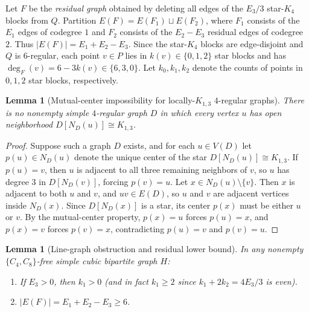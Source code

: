 \documentclass[11pt]{amsart}
\newtheorem{lemma}[theorem]{Lemma}
\theoremstyle{definition}
\theoremstyle{remark}
\begin{document}
Let $F$ be the \emph{residual graph} obtained by deleting all edges of the $E_3/3$ star-$K_4$ blocks from $Q$. Partition $E(F) = E(F_1) \sqcup E(F_2)$, where $F_1$ consists of the $E_1$ edges of codegree $1$ and $F_2$ consists of the $E_2 - E_3$ residual edges of codegree $2$. Thus $|E(F)| = E_1 + E_2 - E_3$. Since the star-$K_4$ blocks are edge-disjoint and $Q$ is $6$-regular, each point $v \in P$ lies in $k(v) \in \{0, 1, 2\}$ star blocks and has $\deg_F(v) = 6 - 3k(v) \in \{6, 3, 0\}$. Let $k_0, k_1, k_2$ denote the counts of points in $0, 1, 2$ star blocks, respectively.

\begin{lemma}[Mutual-center impossibility for locally-$K_{1,3}$ $4$-regular graphs]\label{lem:mutual_center}
There is no nonempty simple $4$-regular graph $D$ in which every vertex $u$ has open neighborhood $D[N_D(u)] \cong K_{1,3}$.
\end{lemma}

\begin{proof}
Suppose such a graph $D$ exists, and for each $u \in V(D)$ let $p(u) \in N_D(u)$ denote the unique center of the star $D[N_D(u)] \cong K_{1,3}$. If $p(u) = v$, then $u$ is adjacent to all three remaining neighbors of $v$, so $u$ has degree $3$ in $D[N_D(v)]$, forcing $p(v) = u$. Let $x \in N_D(u) \setminus \{v\}$. Then $x$ is adjacent to both $u$ and $v$, and $uv \in E(D)$, so $u$ and $v$ are adjacent vertices inside $N_D(x)$. Since $D[N_D(x)]$ is a star, its center $p(x)$ must be either $u$ or $v$. By the mutual-center property, $p(x) = u$ forces $p(u) = x$, and $p(x) = v$ forces $p(v) = x$, contradicting $p(u) = v$ and $p(v) = u$.
\end{proof}

\begin{lemma}[Line-graph obstruction and residual lower bound]\label{lem:line_graph}
In any nonempty $\{C_4, C_8\}$-free simple cubic bipartite graph $H$:
\begin{enumerate}[label=(\alph*)]
\item If $E_3 > 0$, then $k_1 > 0$ (and in fact $k_1 \ge 2$ since $k_1 + 2k_2 = 4E_3/3$ is even).
\item $|E(F)| = E_1 + E_2 - E_3 \ge 6$.
\end{enumerate}
\end{lemma}
\end{document}
